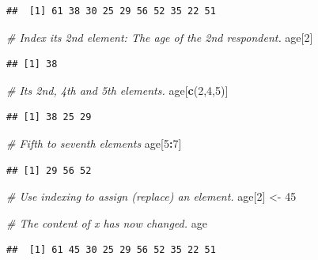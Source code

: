 \documentclass[
]{book}
\newenvironment{Shaded}{\begin{snugshade}}{\end{snugshade}}
\newcommand{\CommentTok}[1]{\textcolor[rgb]{0.56,0.35,0.01}{\textit{#1}}}
\newcommand{\DecValTok}[1]{\textcolor[rgb]{0.00,0.00,0.81}{#1}}
\newcommand{\FunctionTok}[1]{\textcolor[rgb]{0.13,0.29,0.53}{\textbf{#1}}}
\newcommand{\NormalTok}[1]{#1}
\newcommand{\OtherTok}[1]{\textcolor[rgb]{0.56,0.35,0.01}{#1}}
\newcommand{\SpecialCharTok}[1]{\textcolor[rgb]{0.81,0.36,0.00}{\textbf{#1}}}
\begin{document}
\begin{verbatim}
##  [1] 61 38 30 25 29 56 52 35 22 51
\end{verbatim}

\begin{Shaded}
\begin{Highlighting}[]
\CommentTok{\# Index its 2nd element: The age of the 2nd respondent.}
\NormalTok{age[}\DecValTok{2}\NormalTok{]}
\end{Highlighting}
\end{Shaded}

\begin{verbatim}
## [1] 38
\end{verbatim}

\begin{Shaded}
\begin{Highlighting}[]
\CommentTok{\# Its 2nd, 4th and 5th elements.}
\NormalTok{age[}\FunctionTok{c}\NormalTok{(}\DecValTok{2}\NormalTok{,}\DecValTok{4}\NormalTok{,}\DecValTok{5}\NormalTok{)]}
\end{Highlighting}
\end{Shaded}

\begin{verbatim}
## [1] 38 25 29
\end{verbatim}

\begin{Shaded}
\begin{Highlighting}[]
\CommentTok{\# Fifth to seventh elements}
\NormalTok{age[}\DecValTok{5}\SpecialCharTok{:}\DecValTok{7}\NormalTok{]}
\end{Highlighting}
\end{Shaded}

\begin{verbatim}
## [1] 29 56 52
\end{verbatim}

\begin{Shaded}
\begin{Highlighting}[]
\CommentTok{\# Use indexing to assign (replace) an element.}
\NormalTok{age[}\DecValTok{2}\NormalTok{] }\OtherTok{\textless{}{-}} \DecValTok{45}

\CommentTok{\# The content of x has now changed.}
\NormalTok{age}
\end{Highlighting}
\end{Shaded}

\begin{verbatim}
##  [1] 61 45 30 25 29 56 52 35 22 51
\end{verbatim}
\end{document}
